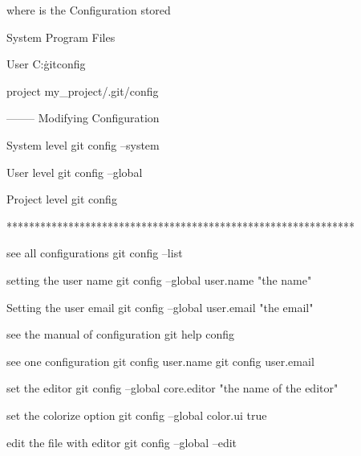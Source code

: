 where is the Configuration stored 

System 
  Program Files\Git\etc\gitconfig 

User 
  C:\Users\pc\.gitconfig

project 
my_project/.git/config 

-------- Modifying  Configuration 

System level
  git config --system 

User level
  git config --global 

Project level
  git config 

**************************************************************

see all configurations 
  git config --list 


setting the user name 
  git config --global user.name "the name"

Setting the user email
  git config --global user.email "the email" 

see the manual of configuration 
  git help config 

see one configuration 
  git config user.name 
  git config user.email  


set the editor 
  git config --global core.editor "the name of the editor"

set the colorize option 
  git config --global color.ui true 

edit the file with editor 
  git config --global --edit 